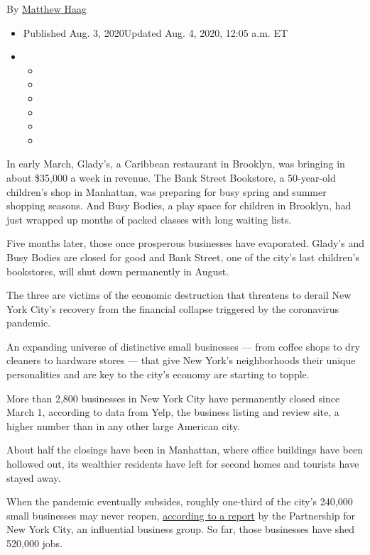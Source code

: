 By \href{https://www.nytimes3xbfgragh.onion/by/matthew-haag}{Matthew
Haag}

\begin{itemize}
\item
  Published Aug. 3, 2020Updated Aug. 4, 2020, 12:05 a.m. ET
\item
  \begin{itemize}
  \item
  \item
  \item
  \item
  \item
  \item
  \end{itemize}
\end{itemize}

In early March, Glady's, a Caribbean restaurant in Brooklyn, was
bringing in about \$35,000 a week in revenue. The Bank Street Bookstore,
a 50-year-old children's shop in Manhattan, was preparing for busy
spring and summer shopping seasons. And Busy Bodies, a play space for
children in Brooklyn, had just wrapped up months of packed classes with
long waiting lists.

Five months later, those once prosperous businesses have evaporated.
Glady's and Busy Bodies are closed for good and Bank Street, one of the
city's last children's bookstores, will shut down permanently in August.

The three are victims of the economic destruction that threatens to
derail New York City's recovery from the financial collapse triggered by
the coronavirus pandemic.

An expanding universe of distinctive small businesses --- from coffee
shops to dry cleaners to hardware stores --- that give New York's
neighborhoods their unique personalities and are key to the city's
economy are starting to topple.

More than 2,800 businesses in New York City have permanently closed
since March 1, according to data from Yelp, the business listing and
review site, a higher number than in any other large American city.

About half the closings have been in Manhattan, where office buildings
have been hollowed out, its wealthier residents have left for second
homes and tourists have stayed away.

When the pandemic eventually subsides, roughly one-third of the city's
240,000 small businesses may never reopen,
\href{https://pfnyc.org/wp-content/uploads/2020/07/actionandcollaboration.pdf}{according
to a report} by the Partnership for New York City, an influential
business group. So far, those businesses have shed 520,000 jobs.

